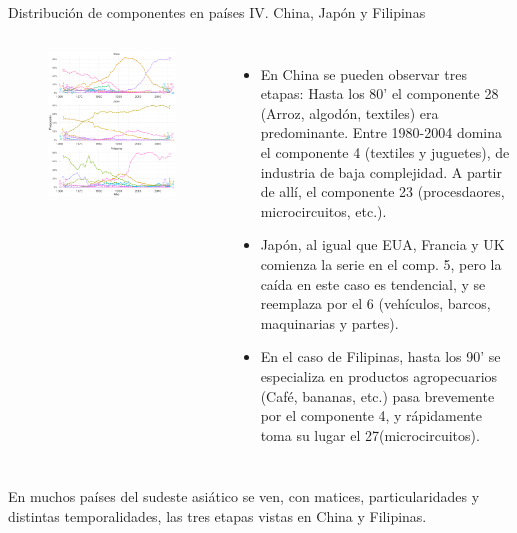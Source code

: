 \documentclass[compress]{beamer}
\begin{document}
\begin{frame}
\small
Distribución de componentes en países IV. China, Japón y Filipinas
\scriptsize
\begin{columns}[c] 
	
	\begin{figure}
		\includegraphics[width=\linewidth]{graficoLDA_k30_CHN_JPN_PHL}
	\end{figure}
	
	
	\begin{itemize}[label=\faRebel]
		\item En China se pueden observar tres etapas: Hasta los 80' el componente 28 (Arroz, algodón, textiles) era predominante. Entre 1980-2004 domina el componente 4 (textiles y juguetes), de industria de baja complejidad. A partir de allí, el componente 23 (procesdaores, microcircuitos, etc.). 
		\item Japón, al igual que EUA, Francia y UK comienza la serie en el comp. 5, pero la caída en este caso es tendencial, y se reemplaza por el 6 (vehículos, barcos, maquinarias y partes). 
		\item En el caso de Filipinas, hasta los 90' se especializa en productos agropecuarios (Café, bananas, etc.) pasa brevemente por el componente 4, y rápidamente toma su lugar el 27(microcircuitos).
	\end{itemize}
	
\end{columns} 

En muchos países del sudeste asiático se ven, con matices, particularidades y distintas temporalidades, las tres etapas vistas en China y Filipinas. 

\end{frame}
\end{document}
